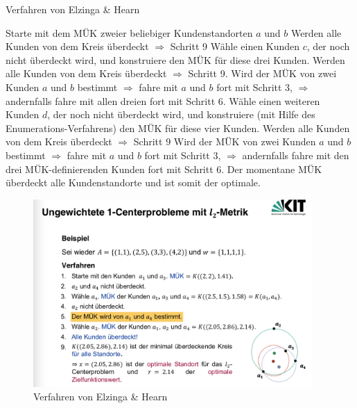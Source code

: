         \begin{algorithm}[H]
          \begin{algorithmic}[1]
            \caption{Verfahren von Elzinga \& Hearn}
            \State Starte mit dem MÜK zweier beliebiger Kundenstandorten $a$ und $b$
            \State Werden alle Kunden von dem Kreis überdeckt $\Rightarrow$ Schritt 9
            \State Wähle einen Kunden $c$, der noch nicht überdeckt wird, und konstruiere den MÜK für diese drei Kunden.
            \State Werden alle Kunden von dem Kreis überdeckt $\Rightarrow$ Schritt 9.
            \State Wird der MÜK von zwei Kunden $a$ und $b$ bestimmt
              $\Rightarrow$ fahre mit $a$ und $b$ fort mit Schritt 3, 
              $\Rightarrow$ andernfalls fahre mit allen dreien fort mit Schritt 6.
            \State Wähle einen weiteren Kunden $d$, der noch nicht überdeckt wird, und konstruiere (mit Hilfe des Enumerations-Verfahrens) den MÜK für diese vier Kunden.  
            \State Werden alle Kunden von dem Kreis überdeckt $\Rightarrow$ Schritt 9
            \State Wird der MÜK von zwei Kunden $a$ und $b$ bestimmt
              $\Rightarrow$ fahre mit $a$ und $b$ fort mit Schritt 3, 
              $\Rightarrow$ andernfalls fahre mit den drei MÜK-definierenden Kunden fort mit Schritt 6.
            \State Der momentane MÜK überdeckt alle Kundenstandorte und ist somit der optimale.
            \end{algorithmic}
        \end{algorithm}

        \begin{exmp}
          
        \end{exmp}

        \begin{figure}[H]
          \centering
          \includegraphics[width=0.95\textwidth]{Images/Verfahren_von_Elzinga_und_Hearn_Bsp.png}
          \caption{Verfahren von Elzinga \& Hearn}
          \label{fig:Verfahren von Elzinga & Hearn}
        \end{figure}

